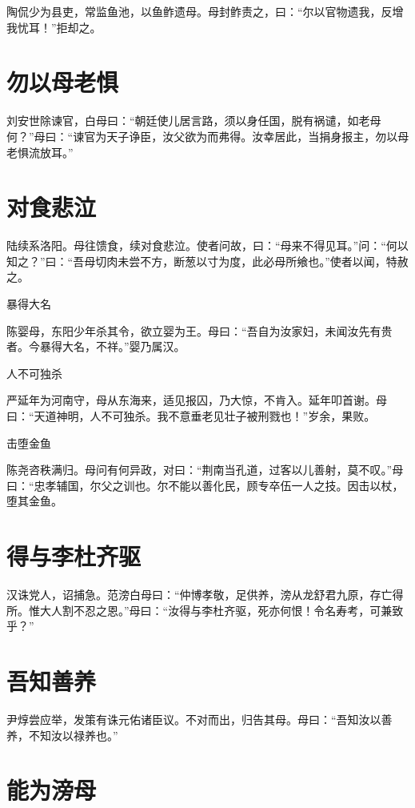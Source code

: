 \documentclass[a4paper,12pt,UTF8,twoside]{ctexbook}
\begin{document}
    陶侃少为县吏，常监鱼池，以鱼鲊遗母。母封鲊责之，曰：“尔以官物遗我，反增我忧耳！”拒却之。
    
    \section{勿以母老惧}
    
    刘安世除谏官，白母曰：“朝廷使儿居言路，须以身任国，脱有祸谴，如老母何？”母曰：“谏官为天子诤臣，汝父欲为而弗得。汝幸居此，当捐身报主，勿以母老惧流放耳。”
    
    \section{对食悲泣}
    
    陆续系洛阳。母往馈食，续对食悲泣。使者问故，曰：“母来不得见耳。”问：“何以知之？”曰：“吾母切肉未尝不方，断葱以寸为度，此必母所飨也。”使者以闻，特赦之。
    
    暴得大名
    
    陈婴母，东阳少年杀其令，欲立婴为王。母曰：“吾自为汝家妇，未闻汝先有贵者。今暴得大名，不祥。”婴乃属汉。
    
    人不可独杀
    
    严延年为河南守，母从东海来，适见报囚，乃大惊，不肯入。延年叩首谢。母曰：“天道神明，人不可独杀。我不意垂老见壮子被刑戮也！”岁余，果败。
    
    击堕金鱼
    
    陈尧咨秩满归。母问有何异政，对曰：“荆南当孔道，过客以儿善射，莫不叹。”母曰：“忠孝辅国，尔父之训也。尔不能以善化民，顾专卒伍一人之技。因击以杖，堕其金鱼。
    
    \section{得与李杜齐驱}
    
    汉诛党人，诏捕急。范滂白母曰：“仲博孝敬，足供养，滂从龙舒君九原，存亡得所。惟大人割不忍之恩。”母曰：“汝得与李杜齐驱，死亦何恨！令名寿考，可兼致乎？”
    
    \section{吾知善养}
    
    尹焞尝应举，发策有诛元佑诸臣议。不对而出，归告其母。母曰：“吾知汝以善养，不知汝以禄养也。”
    
    \section{能为滂母}
    
\end{document}
